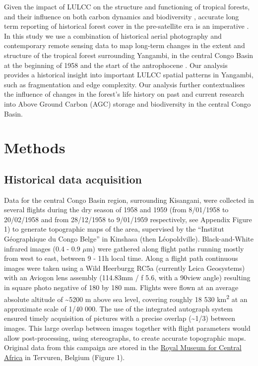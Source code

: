 \documentclass[remote sensing,article,submit,moreauthors,pdftex,10pt,a4paper]{mdpi}
\begin{document}
Given the impact of LULCC on the structure and functioning of tropical
forests, and their influence on both carbon dynamics
\citep{Kearsley2013} and biodiversity \citep{vandeperre2018}, accurate
long term reporting of historical forest cover in the pre-satellite era
is an imperative \citep{willcock2016}. In this study we use a
combination of historical aerial photography and contemporary remote
sensing data to map long-term changes in the extent and structure of the
tropical forest surrounding Yangambi, in the central Congo Basin at the
beginning of 1958 and the start of the antrophocene \citep{lewis2015}.
Our analysis provides a historical insight into important LULCC spatial
patterns in Yangambi, such as fragmentation and edge complexity. Our
analysis further contextualises the influence of changes in the forest's
life history on past and current research into Above Ground Carbon (AGC)
storage \citep{Kearsley2013} and biodiversity \citep{vandeperre2018} in
the central Congo Basin.

\hypertarget{methods}{%
\section{Methods}\label{methods}}

\hypertarget{historical-data-acquisition}{%
\subsection{Historical data
acquisition}\label{historical-data-acquisition}}

Data for the central Congo Basin region, surrounding Kisangani, were
collected in several flights during the dry season of 1958 and 1959
(from 8/01/1958 to 20/02/1958 and from 28/12/1958 to 9/01/1959
respectively, see Appendix Figure 1) to generate topographic maps of the
area, supervised by the ``Institut Géographique du Congo Belge'' in
Kinshasa (then Léopoldville). Black-and-White infrared images (0.4 - 0.9
\(\mu\)m) were gathered along flight paths running mostly from west to
east, between 9 - 11h local time. Along a flight path continuous images
were taken using a Wild Heerburgg RC5a (currently Leica Geosystems) with
an Aviogon lens assembly (114.83mm / f 5.6, with a 90\degree view angle)
resulting in square photo negative of 180 by 180 mm. Flights were flown
at an average absolute altitude of \textasciitilde{}5200 m above sea
level, covering roughly 18 530 km\textsuperscript{2} at an approximate
scale of 1/40 000. The use of the integrated autograph system ensured
timely acquisition of pictures with a precise overlap
(\textasciitilde{}1/3) between images. This large overlap between images
together with flight parameters would allow post-processing, using
stereographs, to create accurate topographic maps. Original data from
this campaign are stored in the
\href{https://www.africamuseum.be/en}{Royal Museum for Central Africa}
in Tervuren, Belgium (Figure 1).
\end{document}
